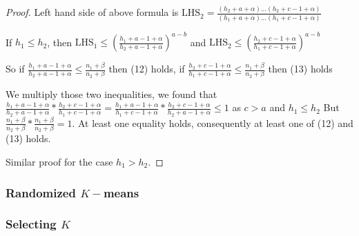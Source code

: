 \documentclass[aoas,preprint]{imsart}
\begin{document}
\begin{proof}
 Left hand side of above formula is $\text{LHS}_2 = \frac{(h_2 + a + \alpha)...(h_2 + c - 1 + \alpha)}{(h_1 + a + \alpha) ... (h_1 + c - 1 + \alpha)}$

If $h_1 \leq h_2$, then $\text{LHS}_1 \leq (\frac{h_1 + a - 1 + \alpha}{h_2 + a  - 1 + \alpha})^{a - b}$ and $\text{LHS}_2 \leq (\frac{h_2 + c - 1 + \alpha}{h_1 + c  - 1 + \alpha})^{a - b}$

So if $\frac{h_1 + a - 1 + \alpha}{h_2 + a  - 1 + \alpha} \leq \frac{n_1 + \beta}{n_2 + \beta} $ then (12) holds, if $\frac{h_2 + c - 1 + \alpha}{h_1 + c  - 1 + \alpha} \leq \frac{n_1 + \beta}{n_2 + \beta}$ then (13) holds

We multiply those two inequalities, we found that $\frac{h_1 + a - 1 + \alpha}{h_2 + a  - 1 + \alpha} * \frac{h_2 + c - 1 + \alpha}{h_1 + c  - 1 + \alpha} = \frac{h_1 + a - 1 + \alpha}{h_1 + c  - 1 + \alpha} * \frac{h_2 + c - 1 + \alpha}{h_2 + a  - 1 + \alpha} \leq 1$ as $c > a$ and $h_1 \leq h_2$ But $\frac{n_1 + \beta}{n_2 + \beta} * \frac{n_1 + \beta}{n_2 + \beta} = 1$. At least one equality holds, consequently at least one of (12) and (13) holds.

Similar proof for the case $h_1 > h_2$.




\end{proof}







\subsubsection{Randomized $K-$means}

\subsubsection{Selecting $K$}
\end{document}
